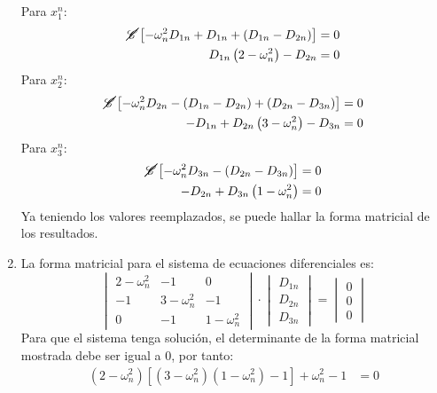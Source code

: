 \begin{multicols}{2}
\begin{enumerate}[leftmargin=15pt]
    Para $x^{n}_{1}$:
    \begin{align*}
        \cancel{\mathscr{C}}\left[-\omega^{2}_{n} D_{1n}  + D_{1n} + (D_{1n} - D_{2n})\right] &= 0\\
        D_{1n} \left(2 - \omega^{2}_{n}\right) - D_{2n} &= 0
    \end{align*}
    Para $x^{n}_{2}$:
    \begin{align*}
        \cancel{\mathscr{C}} \left[-\omega^{2}_{n} D_{2n} - \left(D_{1n} - D_{2n}\right) + \left(D_{2n} - D_{3n}\right)\right] &= 0\\
        - D_{1n} + D_{2n}\left(3 - \omega^{2}_{n}\right) - D_{3n} &= 0
    \end{align*}
    Para $x^{n}_{3}$:
    \begin{align*}
        \cancel{\mathscr{C}} \left[-\omega^{2}_{n} D_{3n} - \left(D_{2n} - D_{3n}\right)\right] &= 0\\
        - D_{2n} + D_{3n}\left(1 - \omega^{2}_{n}\right) &= 0
    \end{align*}
    Ya teniendo los valores reemplazados, se puede hallar la forma matricial de los resultados.
    \item La \textcolor{rojo}{forma matricial} para el sistema de ecuaciones diferenciales es:
    \begin{equation*}
        \begin{vmatrix}
        2 - \omega^{2}_{n} & -1 & 0\\
        -1 & 3 - \omega^{2}_{n} & -1\\
        0 & -1 & 1 - \omega^{2}_{n}
        \end{vmatrix}
        \cdot
        \begin{vmatrix}
            D_{1n} \\
            D_{2n} \\
            D_{3n}
        \end{vmatrix}
        =
        \begin{vmatrix}
            0 \\
            0 \\
            0 
        \end{vmatrix}
    \end{equation*}
    Para que el sistema tenga solución, el determinante de la forma matricial mostrada debe ser igual a 0, por tanto:
    \begin{align*}
        \left(2 - \omega^{2}_{n}\right)\left[\left(3 - \omega^{2}_{n}\right)\left(1 - \omega^{2}_{n}\right) - 1\right] + \omega^{2}_{n} - 1 &= 0
    \end{align*}
\end{enumerate}


\end{multicols}


